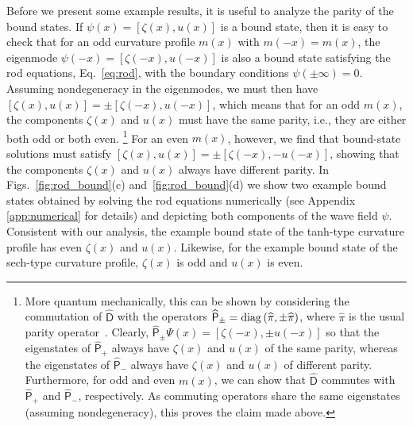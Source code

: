 Before we present some example results, it is useful to analyze the parity of the bound states.
If $\psi(x) = \left[\zeta(x), u(x)\right]$ is a bound state, then it is easy to check that for an odd curvature profile $m(x)$ with $m(-x) = m(x)$, the eigenmode $\psi(-x) = \left[\zeta(-x), u(-x)\right]$ is also a bound state satisfying the rod equations, Eq.~\eqref{eq:rod}, with the boundary conditions $\psi(\pm\infty) = 0$.
Assuming nondegeneracy in the eigenmodes, we must then have $\left[\zeta(x), u(x)\right] = \pm\left[\zeta(-x), u(-x)\right]$, which means that for an odd $m(x)$, the components $\zeta(x)$ and $u(x)$ must have the same parity, i.e., they are either both odd or both even.%
\footnote{%
  More quantum mechanically, this can be shown by considering the commutation of $\widehat{\mathsf{D}}$ with the operators $\widehat{\mathsf{P}}_{\pm} = \operatorname{diag}\left(\widehat{\pi}, \pm\widehat{\pi}\right)$, where $\widehat{\pi}$ is the usual parity operator~\cite{cohen-tannoudji2019}.
  Clearly, $\widehat{\mathsf{P}}_{\pm}\Psi(x) = \left[\zeta(-x), \pm u(-x)\right]$ so that
  the eigenstates of $\widehat{\mathsf{P}}_{+}$ always have $\zeta(x)$ and $u(x)$ of the same parity, whereas the eigenstates of $\widehat{\mathsf{P}}_{-}$ always have $\zeta(x)$ and $u(x)$ of different parity.
  Furthermore, for odd and even $m(x)$, we can show that $\widehat{\mathsf{D}}$ commutes with $\widehat{\mathsf{P}}_{+}$ and $\widehat{\mathsf{P}}_{-}$, respectively.
  As commuting operators share the same eigenstates (assuming nondegeneracy), this proves the claim made above.%
}
For an even $m(x)$, however, we find that bound-state solutions must satisfy $\left[\zeta(x), u(x)\right] = \pm\left[\zeta(-x), -u(-x)\right]$, showing that the components $\zeta(x)$ and $u(x)$ always have different parity.
In Figs.~\ref{fig:rod_bound}(c) and~\ref{fig:rod_bound}(d) we show two example bound states obtained by solving the rod equations numerically (see Appendix \ref{app:numerical} for details) and depicting both components of the wave field $\psi$.
Consistent with our analysis, the example bound state of the tanh-type curvature profile has even $\zeta(x)$ and $u(x)$.
Likewise, for the example bound state of the sech-type curvature profile, $\zeta(x)$ is odd and $u(x)$ is even.

